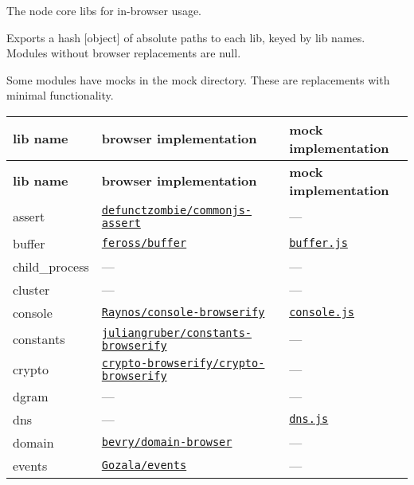The node core libs for in-\/browser usage.

\href{http://david-dm.org/webpack/node-libs-browser}{\tt }

Exports a hash \mbox{[}object\mbox{]} of absolute paths to each lib, keyed by lib names. Modules without browser replacements are {\ttfamily null}.

Some modules have mocks in the {\ttfamily mock} directory. These are replacements with minimal functionality.

\tabulinesep=1mm
\begin{longtabu} spread 0pt [c]{*{3}{|X[-1]}|}
\hline
\rowcolor{\tableheadbgcolor}\textbf{ lib name  }&\textbf{ browser implementation  }&\textbf{ mock implementation   }\\
\endfirsthead
\hline
\endfoot
\hline
\rowcolor{\tableheadbgcolor}\textbf{ lib name  }&\textbf{ browser implementation  }&\textbf{ mock implementation   }\\
\endhead
assert  &\href{https://github.com/defunctzombie/commonjs-assert}{\tt defunctzombie/commonjs-\/assert}  &---   \\
buffer  &\href{https://github.com/feross/buffer}{\tt feross/buffer}  &\href{https://github.com/webpack/node-libs-browser/blob/master/mock/buffer.js}{\tt buffer.\+js}   \\
child\+\_\+process  &---  &---   \\
cluster  &---  &---   \\
console  &\href{https://github.com/Raynos/console-browserify}{\tt Raynos/console-\/browserify}  &\href{https://github.com/webpack/node-libs-browser/blob/master/mock/console.js}{\tt console.\+js}   \\
constants  &\href{https://github.com/juliangruber/constants-browserify}{\tt juliangruber/constants-\/browserify}  &---   \\
crypto  &\href{https://github.com/crypto-browserify/crypto-browserify}{\tt crypto-\/browserify/crypto-\/browserify}  &---   \\
dgram  &---  &---   \\
dns  &---  &\href{https://github.com/webpack/node-libs-browser/blob/master/mock/dns.js}{\tt dns.\+js}   \\
domain  &\href{https://github.com/bevry/domain-browser}{\tt bevry/domain-\/browser}  &---   \\
events  &\href{https://github.com/Gozala/events}{\tt Gozala/events}  &---   \\

\end{longtabu}
